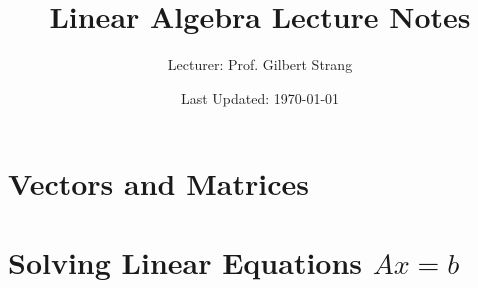 \documentclass[a4paper, oneside, 12pt]{book}
\title{Linear Algebra Lecture Notes}
\author{Lecturer: Prof. Gilbert Strang}
\date{Last Updated: \today}
\begin{document}
\maketitle
\tableofcontents

\chapter{Vectors and Matrices}


\clearpage

\chapter{Solving Linear Equations $Ax=b$}

\end{document}
